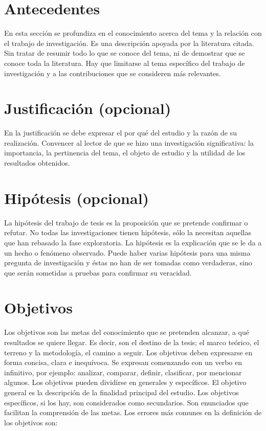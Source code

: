 \section{Antecedentes}\label{secc:antece}
En esta sección se profundiza en el conocimiento acerca del tema y la relación con el trabajo de investigación. Es una descripción apoyada por la literatura citada. Sin tratar de resumir todo lo que se conoce del tema, ni de demostrar que se conoce toda la literatura. Hay que limitarse al tema específico del trabajo de investigación y a las contribuciones que se consideren más relevantes.
\citep{CorderoEsquivel1988}
\section{Justificaci\'on (opcional)}\label{secc:jus}

En la justificación se debe expresar el por qué del estudio y la razón de su realización. Convencer al lector de que se hizo una investigación significativa: la importancia, la pertinencia del tema, el objeto de estudio y la utilidad de los resultados obtenidos.

\section{Hip\'otesis (opcional)}\label{secc:hipot}
La hipótesis del trabajo de tesis es la proposición que se pretende confirmar o refutar. No todas las investigaciones tienen hipótesis, sólo la necesitan aquellas que han rebasado la fase exploratoria. La hipótesis es la explicación que se le da a un hecho o fenómeno observado. Puede haber varias hipótesis para una misma pregunta de investigación y éstas no han de ser tomadas como verdaderas, sino que serán sometidas a pruebas para confirmar su veracidad.

\section{Objetivos}\label{secc:obj}
Los objetivos son las metas del conocimiento que se pretenden alcanzar, a qué resultados se quiere llegar. Es decir, son el destino de la tesis; el marco teórico, el terreno y la metodología, el camino a seguir. Los objetivos deben expresarse en forma concisa, clara e inequívoca. Se expresan comenzando con un verbo en infinitivo, por ejemplo: analizar, comparar, definir, clasificar, por mencionar algunos.
Los objetivos pueden dividirse en generales y específicos. El objetivo general es la descripción de la finalidad principal del estudio. Los objetivos específicos, si los hay, son considerados como secundarios. Son enunciados que facilitan la comprensión de las metas.
Los errores más comunes en la definición de los objetivos son:


